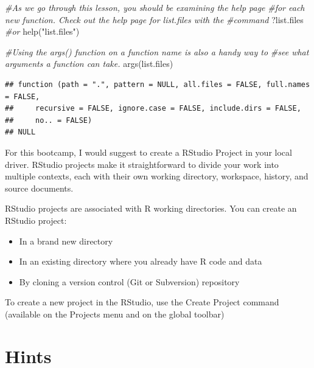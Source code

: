 \documentclass[
]{book}
\newenvironment{Shaded}{\begin{snugshade}}{\end{snugshade}}
\newcommand{\CommentTok}[1]{\textcolor[rgb]{0.56,0.35,0.01}{\textit{#1}}}
\newcommand{\FunctionTok}[1]{\textcolor[rgb]{0.00,0.00,0.00}{#1}}
\newcommand{\NormalTok}[1]{#1}
\newcommand{\StringTok}[1]{\textcolor[rgb]{0.31,0.60,0.02}{#1}}
\providecommand{\tightlist}{%
  \setlength{\itemsep}{0pt}\setlength{\parskip}{0pt}}
\theoremstyle{definition}
\theoremstyle{definition}
\theoremstyle{definition}
\theoremstyle{definition}
\theoremstyle{remark}
\begin{document}
\begin{Shaded}
\begin{Highlighting}[]
\CommentTok{\#As we go through this lesson, you should be examining the help page }
\CommentTok{\#for each new function. Check out the help page for list.files with the}
\CommentTok{\#command}
\NormalTok{?list.files}
\CommentTok{\#or}
\FunctionTok{help}\NormalTok{(}\StringTok{"list.files"}\NormalTok{)}

\CommentTok{\#Using the args() function on a function name is also a handy way to }
\CommentTok{\#see what arguments a function can take.}
\FunctionTok{args}\NormalTok{(list.files)}
\end{Highlighting}
\end{Shaded}

\begin{verbatim}
## function (path = ".", pattern = NULL, all.files = FALSE, full.names = FALSE, 
##     recursive = FALSE, ignore.case = FALSE, include.dirs = FALSE, 
##     no.. = FALSE) 
## NULL
\end{verbatim}

For this bootcamp, I would suggest to create a RStudio Project in your local driver. RStudio projects make it straightforward to divide your work into multiple contexts, each with their own working directory, workspace, history, and source documents.

RStudio projects are associated with R working directories. You can create an RStudio project:

\begin{itemize}
\tightlist
\item
  In a brand new directory
\item
  In an existing directory where you already have R code and data
\item
  By cloning a version control (Git or Subversion) repository
\end{itemize}

To create a new project in the RStudio, use the Create Project command (available on the Projects menu and on the global toolbar)

\hypertarget{hints}{%
\section{Hints}\label{hints}}
\end{document}
